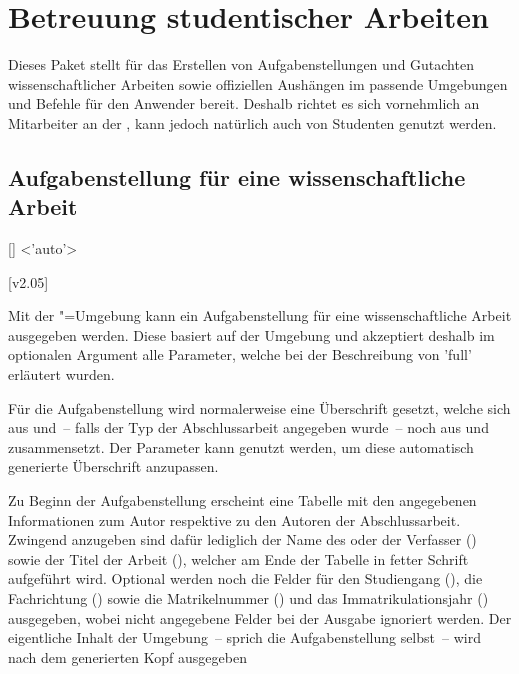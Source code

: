 \chapter[Das Paket \Package*{tudscrsupervisor} -- Studentische Betreuung]{%
  Betreuung studentischer Arbeiten
}
\begin{DeclareEntity}{}
%
Dieses Paket stellt für das Erstellen von Aufgabenstellungen und Gutachten 
wissenschaftlicher Arbeiten sowie offiziellen Aushängen im \CD passende 
Umgebungen und Befehle für den Anwender bereit. Deshalb richtet es sich 
vornehmlich an Mitarbeiter an der \TnUD, kann jedoch natürlich auch von 
Studenten genutzt werden.


\section{Aufgabenstellung für eine wissenschaftliche Arbeit}
%
%
\begin{Declaration}
  {[]}
  <'auto'>
\begin{Declaration}
  {}
\begin{Declaration}
  {}
  [v2.05]
\printdeclarationlist

Mit der "=Umgebung kann ein Aufgabenstellung für eine 
wissenschaftliche Arbeit ausgegeben werden. Diese basiert auf der Umgebung 
 und akzeptiert deshalb im optionalen Argument alle 
Parameter, welche bei der Beschreibung von 'full' 
erläutert wurden.

Für die Aufgabenstellung wird normalerweise eine Überschrift gesetzt, welche 
sich aus  und~-- falls der Typ der Abschlussarbeit angegeben 
wurde~-- noch aus  und  zusammensetzt. Der 
Parameter  kann genutzt werden, um diese 
automatisch generierte Überschrift anzupassen.

Zu Beginn der Aufgabenstellung erscheint eine Tabelle mit den angegebenen 
Informationen zum Autor respektive zu den Autoren der Abschlussarbeit. Zwingend 
anzugeben sind dafür lediglich der Name des oder der Verfasser () 
sowie der Titel der Arbeit (), welcher am Ende der Tabelle in 
fetter Schrift aufgeführt wird. Optional werden noch die Felder für den 
Studiengang (), die Fachrichtung () sowie die 
Matrikelnummer () und das Immatrikulationsjahr 
() ausgegeben, wobei nicht angegebene Felder bei der 
Ausgabe ignoriert werden. Der eigentliche Inhalt der Umgebung~-- sprich die 
Aufgabenstellung selbst~-- wird nach dem generierten Kopf ausgegeben


\end{Declaration}
\end{Declaration}
\end{Declaration}
\end{DeclareEntity}
